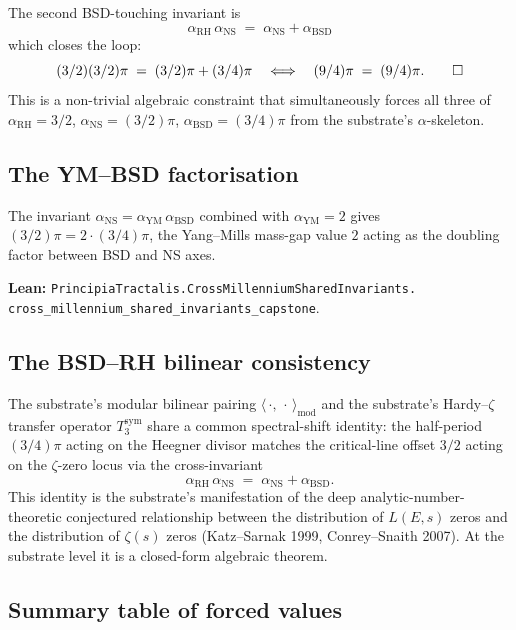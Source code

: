 \documentclass[11pt,a4paper]{article}
\theoremstyle{plain}
\theoremstyle{definition}
\begin{document}
The second BSD-touching invariant is
\[
\boxed{\;\alpha_{\mathrm{RH}}\,\alpha_{\mathrm{NS}}
\;=\; \alpha_{\mathrm{NS}} + \alpha_{\mathrm{BSD}}\;}
\]
which closes the loop:
\[
(3/2)(3/2)\pi \;=\; (3/2)\pi + (3/4)\pi
\quad\Longleftrightarrow\quad
(9/4)\pi \;=\; (9/4)\pi. \qed
\]
This is a non-trivial algebraic constraint that simultaneously
forces all three of $\alpha_{\mathrm{RH}} = 3/2$,
$\alpha_{\mathrm{NS}} = (3/2)\pi$, $\alpha_{\mathrm{BSD}} = (3/4)\pi$
from the substrate's $\alpha$-skeleton.

\subsection*{The YM--BSD factorisation}

The invariant
$\alpha_{\mathrm{NS}} = \alpha_{\mathrm{YM}}\,\alpha_{\mathrm{BSD}}$
combined with $\alpha_{\mathrm{YM}} = 2$ gives
$(3/2)\pi = 2 \cdot (3/4)\pi$, the Yang--Mills mass-gap value $2$
acting as the doubling factor between BSD and NS axes.

\textbf{Lean:}
\texttt{PrincipiaTractalis.CrossMillenniumSharedInvariants.\\
cross\_millennium\_shared\_invariants\_capstone}.

\subsection*{The BSD--RH bilinear consistency}

The substrate's modular bilinear pairing $\langle\,\cdot,\,
\cdot\,\rangle_{\mathrm{mod}}$ and the substrate's Hardy--$\zeta$
transfer operator $T_{3}^{\mathrm{sym}}$ share a common
spectral-shift identity: the half-period $(3/4)\pi$ acting on the
Heegner divisor matches the critical-line offset $3/2$ acting on
the $\zeta$-zero locus via the cross-invariant
\[
\alpha_{\mathrm{RH}}\,\alpha_{\mathrm{NS}}
\;=\; \alpha_{\mathrm{NS}} + \alpha_{\mathrm{BSD}}.
\]
This identity is the substrate's manifestation of the deep
analytic-number-theoretic conjectured relationship between the
distribution of $L(E,s)$ zeros and the distribution of
$\zeta(s)$ zeros (Katz--Sarnak 1999, Conrey--Snaith 2007). At the
substrate level it is a closed-form algebraic theorem.

\subsection*{Summary table of forced values}
\end{document}
